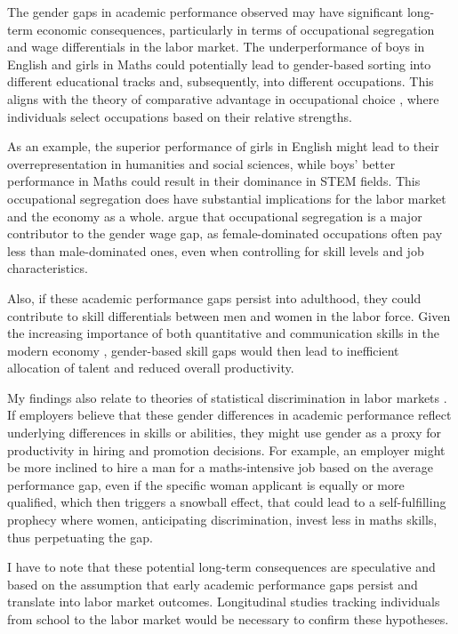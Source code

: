 \documentclass[12pt,a4paper,onecolumn]{article}
\numberwithin{equation}{section}
\begin{document}
The gender gaps in academic performance observed may have significant long-term economic consequences, particularly in terms of occupational segregation and wage differentials in the labor market. The underperformance of boys in English and girls in Maths could potentially lead to gender-based sorting into different educational tracks and, subsequently, into different occupations. This aligns with the theory of comparative advantage in occupational choice \parencite{rosen1978substitution}, where individuals select occupations based on their relative strengths.

As an example, the superior performance of girls in English might lead to their overrepresentation in humanities and social sciences, while boys' better performance in Maths could result in their dominance in STEM fields. This occupational segregation does have substantial implications for the labor market and the economy as a whole. \textcite{blau2017gender} argue that occupational segregation is a major contributor to the gender wage gap, as female-dominated occupations often pay less than male-dominated ones, even when controlling for skill levels and job characteristics.

Also, if these academic performance gaps persist into adulthood, they could contribute to skill differentials between men and women in the labor force. Given the increasing importance of both quantitative and communication skills in the modern economy \parencite{deming2017growing}, gender-based skill gaps would then lead to inefficient allocation of talent and reduced overall productivity.

My findings also relate to theories of statistical discrimination in labor markets \parencite{phelps1972statistical}. If employers believe that these gender differences in academic performance reflect underlying differences in skills or abilities, they might use gender as a proxy for productivity in hiring and promotion decisions. For example, an employer might be more inclined to hire a man for a maths-intensive job based on the average performance gap, even if the specific woman applicant is equally or more qualified, which then triggers a snowball effect, that could lead to a self-fulfilling prophecy where women, anticipating discrimination, invest less in maths skills, thus perpetuating the gap.

I have to note that these potential long-term consequences are speculative and based on the assumption that early academic performance gaps persist and translate into labor market outcomes. Longitudinal studies tracking individuals from school to the labor market would be necessary to confirm these hypotheses. 
\end{document}
